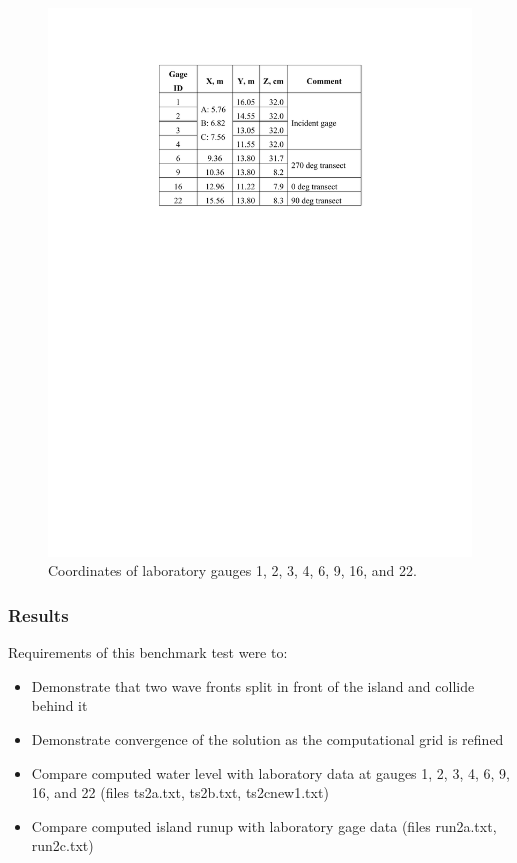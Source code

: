 \begin{figure}[ht]
\hfil\includegraphics[width=5.0in]{bp6/Table.pdf}\hfil
\caption{\label{Table}
Coordinates of laboratory gauges 1, 2, 3, 4, 6, 9, 16, and 22.
  }
\end{figure} 

\subsubsection{Results}
  Requirements of this benchmark test were to:
\begin{itemize}
\item Demonstrate that two wave fronts split in front of the island and collide behind it
\item Demonstrate convergence of the solution as the computational grid is refined
\item Compare computed water level with laboratory data at gauges 1, 2, 3, 4, 6, 9, 16, and 22 (files ts2a.txt, ts2b.txt, ts2cnew1.txt)
\item Compare computed island runup with laboratory gage data (files run2a.txt, run2c.txt)
\end{itemize}

